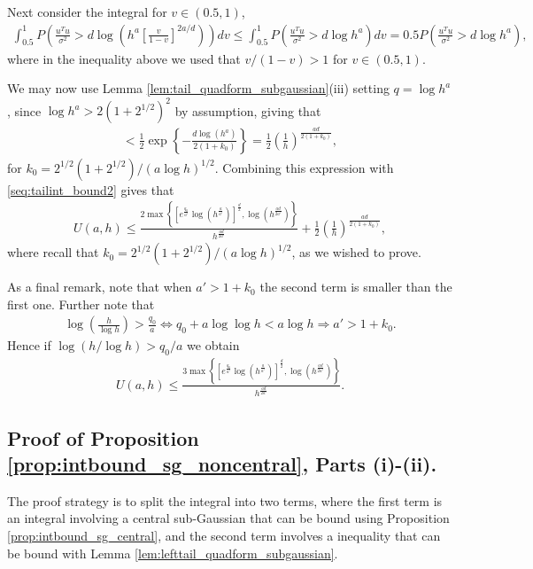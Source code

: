 Next consider the integral for $v \in (0.5,1)$,
\begin{align}
 \int_{0.5}^1 P \left( \frac{u^Tu}{\sigma^2} > d \log \left( h^a \left[ \frac{v}{1-v} \right]^{2a/d} \right) \right) dv
\nonumber
\leq \int_{0.5}^1 P \left( \frac{u^T u}{\sigma^2} > d \log h^a \right) dv=
0.5  P \left( \frac{u^T u}{\sigma^2} > d \log h^a \right),
\nonumber
\end{align}
where in the inequality above we used that $v/(1-v)>1$ for $v \in (0.5,1)$.

We may now use Lemma \ref{lem:tail_quadform_subgaussian}(iii) setting $q= \log h^a$, since $\log h^a > 2 (1+2^{1/2})^2$ by assumption, giving that
\begin{align}
< \frac{1}{2} \exp \left\{ -\frac{d \log(h^a)}{2(1+k_0)} \right\}
= \frac{1}{2} \left( \frac{1}{h} \right)^{\frac{ad}{2(1+k_0)}},
\nonumber
\end{align}
for $k_0= 2^{1/2}(1+2^{1/2})/(a \log h)^{1/2}$.
Combining this expression with \eqref{seq:tailint_bound2} gives that
\begin{align}
 U(a,h) \leq \frac{2\max \left\{ [e^{\frac{q_0}{a'}} \log (h^{\frac{a}{a'}})]^{\frac{d}{2}}, \log (h^{\frac{ad}{2a'}}) \right\} }{h^{\frac{ad}{2a'}}}
+ \frac{1}{2} \left( \frac{1}{h} \right)^{\frac{ad}{2(1+k_0)}},
\nonumber
\end{align}
where recall that $k_0= 2^{1/2}(1+2^{1/2})/(a \log h)^{1/2}$, as we wished to prove.

As a final remark, note that when $a' > 1 + k_0$ the second term is smaller than the first one.
Further note that
\begin{align}
\log \left( \frac{h}{\log h} \right) > \frac{q_0}{a} \Leftrightarrow 
q_0 + a \log\log h < a \log h  \Rightarrow a' > 1 + k_0.
\nonumber
\end{align}
Hence if $\log \left( h/\log h \right) > q_0/a$ we obtain
\begin{align}
 U(a,h) \leq \frac{3\max \left\{ [e^{\frac{q_0}{a'}} \log (h^{\frac{a}{a'}})]^{\frac{d}{2}}, \log (h^{\frac{ad}{2a'}}) \right\} }{h^{\frac{ad}{2a'}}}.
\nonumber
\end{align}



\subsection{Proof of Proposition \ref{prop:intbound_sg_noncentral}, Parts (i)-(ii).}

The proof strategy is to split the integral into two terms, where the first term is an integral involving a central sub-Gaussian that can be bound using Proposition \ref{prop:intbound_sg_central}, and the second term involves a inequality that can be bound with Lemma \ref{lem:lefttail_quadform_subgaussian}.

